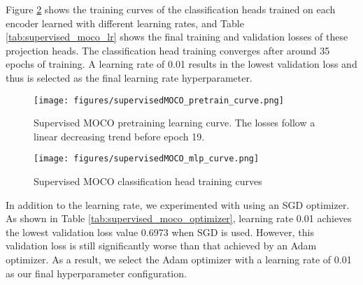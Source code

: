 \documentclass[12pt,twoside]{report}
\begin{document}
Figure \ref{fig:supervisedMOCO_mlp_curve} shows the training curves of the classification heads trained on each encoder learned with different learning rates, and Table \ref{tab:supervised_moco_lr} shows the final training and validation losses of these projection heads. The classification head training converges after around 35 epochs of training. A learning rate of 0.01 results in the lowest validation loss and thus is selected as the final learning rate hyperparameter.\\

\begin{figure}
    \centering
    \texttt{[image: figures/supervisedMOCO\_pretrain\_curve.png]}
    \caption{Supervised MOCO pretraining learning curve. The losses follow a linear decreasing trend before epoch 19.}
    \label{fig:supervisedMOCO_pretrain_curve}
\end{figure}

\begin{figure}
    \centering
    \texttt{[image: figures/supervisedMOCO\_mlp\_curve.png]}
    \caption{Supervised MOCO classification head training curves}
    \label{fig:supervisedMOCO_mlp_curve}
\end{figure}


In addition to the learning rate, we experimented with using an SGD optimizer. As shown in Table \ref{tab:supervised_moco_optimizer}, learning rate 0.01 achieves the lowest validation loss value 0.6973 when SGD is used. However, this validation loss is still significantly worse than that achieved by an Adam optimizer. As a result, we select the Adam optimizer with a learning rate of 0.01 as our final hyperparameter configuration. \\
\end{document}
